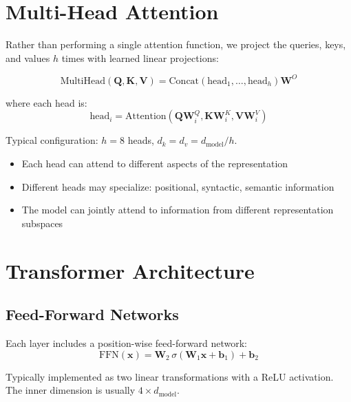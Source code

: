 \section{Multi-Head Attention}

Rather than performing a single attention function, we project the queries, keys, and values $h$ times with learned linear projections:

\begin{equation}
\text{MultiHead}(\mathbf{Q}, \mathbf{K}, \mathbf{V}) = \text{Concat}\left(\text{head}_1, \ldots, \text{head}_h\right)\mathbf{W}^O
\end{equation}

where each head is:
\begin{equation}
\text{head}_i = \text{Attention}\left(\mathbf{Q}\mathbf{W}_i^Q, \mathbf{K}\mathbf{W}_i^K, \mathbf{V}\mathbf{W}_i^V\right)
\end{equation}

Typical configuration: $h = 8$ heads, $d_k = d_v = d_{\text{model}}/h$.

\begin{properties}
\begin{itemize}
    \item Each head can attend to different aspects of the representation
    \item Different heads may specialize: positional, syntactic, semantic information
    \item The model can jointly attend to information from different representation subspaces
\end{itemize}
\end{properties}

\section{Transformer Architecture}

\subsection{Feed-Forward Networks}

Each layer includes a position-wise feed-forward network:
\begin{equation}
\text{FFN}(\mathbf{x}) = \mathbf{W}_2 \, \sigma\left(\mathbf{W}_1 \mathbf{x} + \mathbf{b}_1\right) + \mathbf{b}_2
\end{equation}

Typically implemented as two linear transformations with a ReLU activation. The inner dimension is usually $4 \times d_{\text{model}}$.

